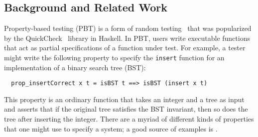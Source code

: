 
\subsection{Background and Related Work }


%
%
Property-based testing (PBT) is a form of random testing~\cite{hamlet1994random}
that was popularized by the QuickCheck~\cite{DBLP:conf/icfp/ClaessenH00} library
in Haskell. In PBT, users write executable functions that act as partial
specifications of a function under test. For example, a tester might write the
following property to specify the \lstinline{insert} function for an
implementation of a binary search tree (BST):
\begin{lstlisting}
  prop_insertCorrect x t = isBST t ==> isBST (insert x t)
\end{lstlisting}
This property is an ordinary function that takes an integer and a tree as input
and asserts that if the original tree satisfies the BST invariant, then so does
the tree after inserting the integer. There are a myriad of different kinds of
properties that one might use to specify a system; a good source of examples is
\citet{HowToSpecifyIt}.

